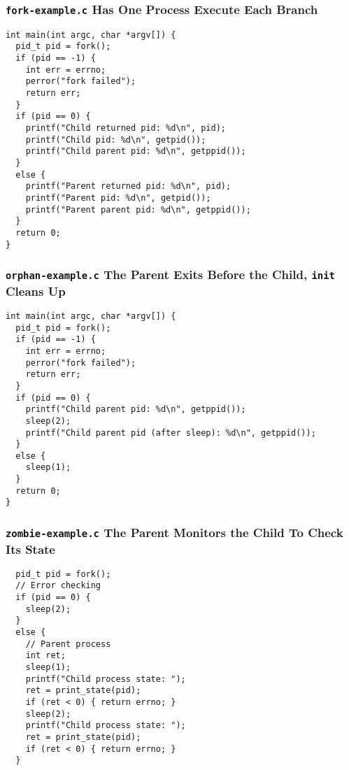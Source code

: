   \begin{frame}[fragile]
    \frametitle{\texttt{fork-example.c} Has One Process Execute Each Branch}

    \begin{lstlisting}
int main(int argc, char *argv[]) {
  pid_t pid = fork();
  if (pid == -1) {
    int err = errno;
    perror("fork failed");
    return err;
  }
  if (pid == 0) {
    printf("Child returned pid: %d\n", pid);
    printf("Child pid: %d\n", getpid());
    printf("Child parent pid: %d\n", getppid());
  }
  else {
    printf("Parent returned pid: %d\n", pid);
    printf("Parent pid: %d\n", getpid());
    printf("Parent parent pid: %d\n", getppid());
  }
  return 0;
}
    \end{lstlisting}
  \end{frame}

  \begin{frame}[fragile]
    \frametitle{\texttt{orphan-example.c} The Parent Exits Before the Child, \texttt{init} Cleans Up}

    \begin{lstlisting}
int main(int argc, char *argv[]) {
  pid_t pid = fork();
  if (pid == -1) {
    int err = errno;
    perror("fork failed");
    return err;
  }
  if (pid == 0) {
    printf("Child parent pid: %d\n", getppid());
    sleep(2);
    printf("Child parent pid (after sleep): %d\n", getppid());
  }
  else {
    sleep(1);
  }
  return 0;
}

    \end{lstlisting}
  \end{frame}

  \begin{frame}[fragile]
    \frametitle{\texttt{zombie-example.c} The Parent Monitors the Child To Check Its State}

    \begin{lstlisting}
  pid_t pid = fork();
  // Error checking
  if (pid == 0) {
    sleep(2);
  }
  else {
    // Parent process
    int ret;
    sleep(1);
    printf("Child process state: ");
    ret = print_state(pid);
    if (ret < 0) { return errno; }
    sleep(2);
    printf("Child process state: ");
    ret = print_state(pid);
    if (ret < 0) { return errno; }
  }
    \end{lstlisting}
  \end{frame}


